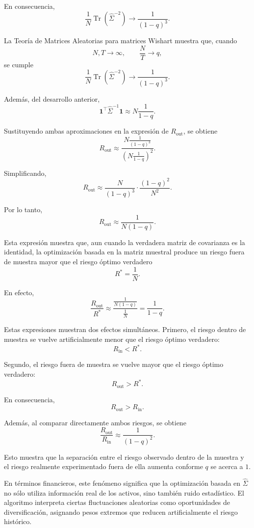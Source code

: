 \documentclass[letterpaper,12pt,oneside]{book}
\begin{document}
En consecuencia,
\[
\frac{1}{N}
\operatorname{Tr}
\left(
\widehat{\Sigma}^{-2}
\right)
\longrightarrow
\frac{1}{(1-q)^3}.
\]

La Teoría de Matrices Aleatorias para matrices Wishart muestra que, cuando
\[
N,T\to\infty,
\qquad
\frac{N}{T}\to q,
\]
se cumple
\[
\frac{1}{N}
\operatorname{Tr}
\left(
\widehat{\Sigma}^{-2}
\right)
\longrightarrow
\frac{1}{(1-q)^3}.
\]

Además, del desarrollo anterior,
\[
\mathbf{1}^{\top}
\widehat{\Sigma}^{-1}
\mathbf{1}
\approx
N\frac{1}{1-q}.
\]

Sustituyendo ambas aproximaciones en la expresión de \(R_{\mathrm{out}}\), se obtiene
\[
R_{\mathrm{out}}
\approx
\frac{
N\frac{1}{(1-q)^3}
}{
\left(
N\frac{1}{1-q}
\right)^2
}.
\]

Simplificando,
\[
R_{\mathrm{out}}
\approx
\frac{
N
}{
(1-q)^3
}
\cdot
\frac{
(1-q)^2
}{
N^2
}.
\]

Por lo tanto,
\[
R_{\mathrm{out}}
\approx
\frac{1}{N(1-q)}.
\]

Esta expresión muestra que, aun cuando la verdadera matriz de covarianza es la identidad, la optimización basada en la matriz muestral produce un riesgo fuera de muestra mayor que el riesgo óptimo verdadero
\[
R^*=\frac{1}{N}.
\]

En efecto,
\[
\frac{R_{\mathrm{out}}}{R^*}
\approx
\frac{
\frac{1}{N(1-q)}
}{
\frac{1}{N}
}
=
\frac{1}{1-q}.
\]

Estas expresiones muestran dos efectos simultáneos. Primero, el riesgo dentro de muestra se vuelve artificialmente menor que el riesgo óptimo verdadero:
\[
R_{\mathrm{in}}
<
R^*.
\]

Segundo, el riesgo fuera de muestra se vuelve mayor que el riesgo óptimo verdadero:
\[
R_{\mathrm{out}}
>
R^*.
\]

En consecuencia,
\[
R_{\mathrm{out}}
>
R_{\mathrm{in}}.
\]

Además, al comparar directamente ambos riesgos, se obtiene
\[
\frac{R_{\mathrm{out}}}{R_{\mathrm{in}}}
\approx
\frac{1}{(1-q)^2}.
\]

Esto muestra que la separación entre el riesgo observado dentro de la muestra y el riesgo realmente experimentado fuera de ella aumenta conforme \(q\) se acerca a \(1\).

En términos financieros, este fenómeno significa que la optimización basada en \(\widehat{\Sigma}\) no sólo utiliza información real de los activos, sino también ruido estadístico. El algoritmo interpreta ciertas fluctuaciones aleatorias como oportunidades de diversificación, asignando pesos extremos que reducen artificialmente el riesgo histórico.
\end{document}
